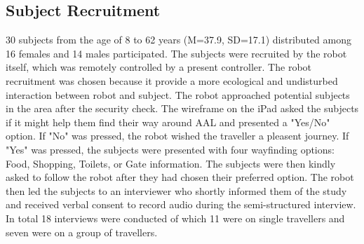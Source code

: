 \subsection{Subject Recruitment}
30 subjects from the age of 8 to 62 years (M=37.9, SD=17.1) distributed among 16 females and 14 males participated. The subjects were recruited by the robot itself, which was remotely controlled by a present controller. The robot recruitment was chosen because it provide a more ecological and undisturbed interaction between robot and subject. The robot approached potential subjects in the area after the security check. The wireframe on the iPad asked the subjects if it might help them find their way around AAL and presented a "Yes/No" option. If "No" was pressed, the robot wished the traveller a pleasent journey. If "Yes" was pressed, the subjects were presented with four wayfinding options: Food, Shopping, Toilets, or Gate information. The subjects were then kindly asked to follow the robot after they had chosen their preferred option. The robot then led the subjects to an interviewer who shortly informed them of the study and received verbal consent to record audio during the semi-structured interview. In total 18 interviews were conducted of which 11 were on single travellers and seven were on a group of travellers.
%
